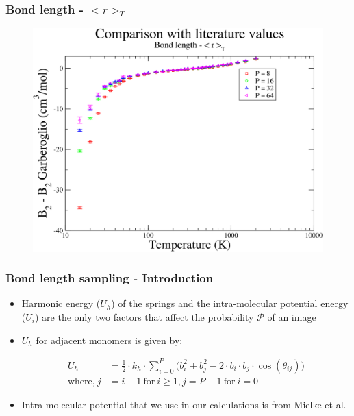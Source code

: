 \documentclass[xcolor=svgnames]{beamer}
\begin{document}
	\begin{frame}
	\frametitle{Bond length - $< r >_T$}
	\begin{figure}
	\centering
	\includegraphics[scale=0.18,keepaspectratio]{8sfTAResultsDiff.png}
	\end{figure}
	
	\end{frame}
    \iffalse
	\begin{frame}
	\frametitle{Bond length sampling - Introduction}
	\begin{itemize}
	\justifying
	\item Harmonic energy ($U_h$) of the springs and the intra-molecular potential energy ($U_i$) are the only two factors that affect the probability $\mathcal{P}$ of an image
	\item $U_h$ for adjacent monomers is given by:
	\begin{figure}
	\centering
	\def\svgscale{0.2}
	
	\end{figure}
	\begin{equation*}
	\begin{aligned}
	U_h &= \frac{1}{2} \cdot k_h \cdot \displaystyle\sum\limits_{i=0}^P \Big( b_i^2 + b_j^2 - 2 \cdot b_i \cdot b_j \cdot \cos (\theta_{ij}) \Big)\\
	\text{where,} \: j &= i - 1 \: \text{for} \: i \ge 1 , j = P - 1\: \text{for} \: i = 0
	\end{aligned}
	\end{equation*}
	\item Intra-molecular potential that we use in our calculations is from Mielke et al.\putCitation{Mielke2002}
	\end{itemize}
	\end{frame}
\end{document}
